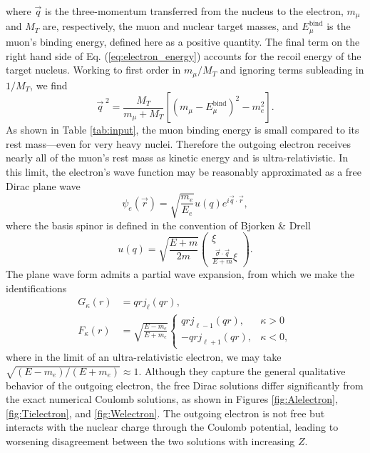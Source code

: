 \documentclass[12pt,letterpaper]{book}
\begin{document}
where $\vec{q}$ is the three-momentum transferred from the nucleus to the electron, $m_{\mu}$ and $M_T$ are, respectively, the muon and nuclear target masses, and $E_{\mu}^\mathrm{bind}$ is the muon's binding energy, defined here as a positive quantity. The final term on the right hand side of Eq. (\ref{eq:electron_energy}) accounts for the recoil energy of the target nucleus. Working to first order in $m_{\mu}/M_T$ and ignoring terms subleading in $1/M_T$, we find
\begin{equation}
\vec{q}^{\;2}=\frac{M_T}{m_{\mu}+M_T}\left[\left(m_{\mu}-E_{\mu}^\mathrm{bind}\right)^2-m_e^2\right].
\end{equation}
As shown in Table \ref{tab:input}, the muon binding energy is small compared to its rest mass---even for very heavy nuclei. Therefore the outgoing electron receives nearly all of the muon's rest mass as kinetic energy and is ultra-relativistic. In this limit, the electron's wave function may be reasonably approximated as a free Dirac plane wave
\begin{equation}
\psi_e(\vec{r})=\sqrt{\frac{m_e}{E_e}}u(q)e^{i\vec{q}\cdot\vec{r}},
\end{equation}
where the basis spinor is defined in the convention of Bjorken \& Drell \cite{Bjorken:1965sts}
\begin{equation}
u(q)=\sqrt{\frac{E+m}{2m}}\left(\begin{array}{c}
\xi\\
\frac{\vec{\sigma}\cdot\vec{q}}{E+m}\xi
\end{array}\right).
\end{equation}
The plane wave form admits a partial wave expansion, from which we make the identifications
\begin{equation}
\begin{split}
G_{\kappa}(r)&=qrj_{\ell}(qr),\\
F_{\kappa}(r)&=\sqrt{\frac{E-m_e}{E+m_e}}\left\{\begin{array}{cc}
qrj_{\ell-1}(qr), & \kappa>0\\
-qrj_{\ell+1}(qr), &\kappa < 0,
\end{array}\right.
\end{split}
\end{equation}
where in the limit of an ultra-relativistic electron, we may take $\sqrt{(E-m_e)/(E+m_e)}\approx 1$. Although they capture the general qualitative behavior of the outgoing electron, the free Dirac solutions differ significantly from the exact numerical Coulomb solutions, as shown in Figures \ref{fig:Alelectron}, \ref{fig:Tielectron}, and \ref{fig:Welectron}. The outgoing electron is not free but interacts with the nuclear charge through the Coulomb potential, leading to worsening disagreement between the two solutions with increasing $Z$.
\end{document}
